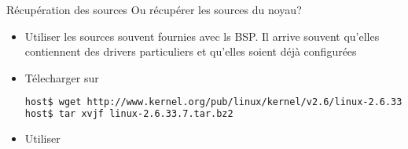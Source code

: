 \begin{frame}[fragile=singleslide]{Récupération des sources}
  Ou récupérer les sources du noyau?
  \begin{itemize} 
  \item Utiliser les sources souvent  fournies avec ls BSP.  Il arrive
    souvent qu'elles contiennent  des drivers particuliers et qu'elles
    soient déjà configurées
  \item Télecharger sur 
    \begin{lstlisting}[language=sh]
host$ wget http://www.kernel.org/pub/linux/kernel/v2.6/linux-2.6.33.7.tar.bz2
host$ tar xvjf linux-2.6.33.7.tar.bz2
    \end{lstlisting}
  \item Utiliser 
  \end{itemize} 
\end{frame} 

